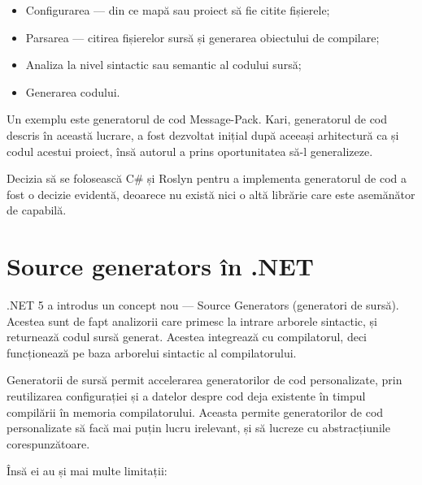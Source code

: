 \documentclass[a4paper,12pt]{report}
\begin{document}
\begin{itemize}
  \item Configurarea --- din ce mapă sau proiect să fie citite fișierele;
  \item Parsarea --- citirea fișierelor sursă și generarea obiectului de compilare;
  \item Analiza la nivel sintactic sau semantic al codului sursă;
  \item Generarea codului.
\end{itemize}

Un exemplu este generatorul de cod Message-Pack\cite{message_pack_github}.
Kari, generatorul de cod descris în această lucrare, a fost dezvoltat inițial după aceeași arhitectură ca și codul acestui proiect, însă autorul a prins oportunitatea să-l generalizeze.

Decizia să se folosească C\# și Roslyn pentru a implementa generatorul de cod a fost o decizie evidentă, deoarece nu există nici o altă librărie care este asemănător de capabilă.

\section{Source generators în {{.}NET}}

{{.}NET} 5 a introdus un concept nou --- Source Generators (generatori de sursă)\cite{source_generators}.
Acestea sunt de fapt analizorii care primesc la intrare arborele sintactic, și returnează codul sursă generat.
Acestea integrează cu compilatorul, deci funcționează pe baza arborelui sintactic al compilatorului.

Generatorii de sursă permit accelerarea generatorilor de cod personalizate, prin reutilizarea configurației și a datelor despre cod deja existente în timpul compilării în memoria compilatorului.
Aceasta permite generatorilor de cod personalizate să facă mai puțin lucru irelevant, și să lucreze cu abstracțiunile corespunzătoare.

Însă ei au și mai multe limitații:
\end{document}
